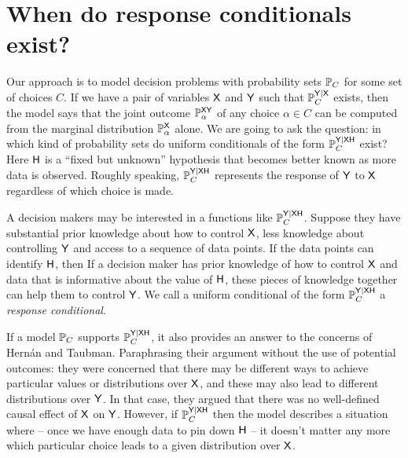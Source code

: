 
\section{When do response conditionals exist?}


Our approach is to model decision problems with probability sets $\mathbb{P}_C$ for some set of choices $C$. If we have a pair of variables $\mathsf{X}$ and $\mathsf{Y}$ such that $\mathbb{P}_C^{\mathsf{Y}|\mathsf{X}}$ exists, then the model says that the joint outcome $\mathbb{P}_\alpha^{\mathsf{XY}}$ of any choice $\alpha\in C$ can be computed from the marginal distribution $\mathbb{P}_\alpha^{\mathsf{X}}$ alone. We are going to ask the question: in which kind of probability sets do uniform conditionals of the form $\mathbb{P}_C^{\mathsf{Y}|\mathsf{X}\mathsf{H}}$ exist? Here $\mathsf{H}$ is a ``fixed but unknown'' hypothesis that becomes better known as more data is observed. Roughly speaking, $\mathbb{P}_C^{\mathsf{Y}|\mathsf{X}\mathsf{H}}$ represents the response of $\mathsf{Y}$ to $\mathsf{X}$ regardless of which choice is made.

A decision makers may be interested in a functions like $\mathbb{P}_C^{\mathsf{Y}|\mathsf{X}\mathsf{H}}$. Suppose they have substantial prior knowledge about how to control $\mathsf{X}$, less knowledge about controlling $\mathsf{Y}$ and access to a sequence of data points. If the data points can identify $\mathsf{H}$, then  If a decision maker has prior knowledge of how to control $\mathsf{X}$ and data that is informative about the value of $\mathsf{H}$, these pieces of knowledge together can help them to control $\mathsf{Y}$. We call a uniform conditional of the form $\mathbb{P}_C^{\mathsf{Y}|\mathsf{X}\mathsf{H}}$ a \emph{response conditional}.

If a model $\mathbb{P}_C$ supports $\mathbb{P}_C^{\mathsf{Y}|\mathsf{XH}}$, it also provides an answer to the concerns of Hernán and Taubman. Paraphrasing their argument without the use of potential outcomes: they were concerned that there may be different ways to achieve particular values or distributions over $\mathsf{X}$, and these may also lead to different distributions over $\mathsf{Y}$. In that case, they argued that there was no well-defined causal effect of $\mathsf{X}$ on $\mathsf{Y}$. However, if $\mathbb{P}_C^{\mathsf{Y}|\mathsf{XH}}$ then the model describes a situation where -- once we have enough data to pin down $\mathsf{H}$ -- it doesn't matter any more which particular choice leads to a given distribution over $\mathsf{X}$.

